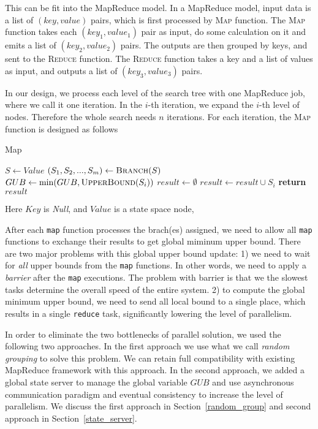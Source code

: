 This can be fit into the MapReduce model. In a MapReduce model, input data is a list of $(key, value)$ pairs, which is first processed by \textsc{Map} function. The \textsc{Map} function takes each $(key_1, value_1)$ pair as input, do some calculation on it and emits a list of $(key_2, value_2)$ pairs. The outputs are then grouped by keys, and sent to the \textsc{Reduce} function. The \textsc{Reduce} function takes a key and a list of values as input, and outputs a list of $(key_3, value_3)$ pairs.

In our design, we process each level of the search tree with one MapReduce job, where we call it one iteration. In the $i$-th iteration, we expand the $i$-th level of nodes. Therefore the whole search needs $n$ iterations. For each iteration, the \textsc{Map} function is designed as follows
\begin{algorithm}
\caption{Map}
\begin{algorithmic}[1]
    \State $S \gets Value$
    \State $(S_1,S_2,...,S_m) \gets \textsc{Branch}(S)$
        \State $GUB \gets \min(GUB, \textsc{UpperBound}(S_i))$
    \EndFor
    \State $result \gets \emptyset$
            \State $result \gets result\cup S_i$
        \EndIf
    \EndFor
    \State \textbf{return }$result$
\EndFunction
\end{algorithmic}
\end{algorithm}

Here $Key$ is \textit{Null}, and $Value$ is a state space node, 


After each \texttt{map} function processes the brach(es) assigned, we need to allow all \texttt{map} functions to exchange their results to get global miminum upper bound. There are two major problems with this global upper bound update: 1) we need to wait for \emph{all} upper bounds from the \texttt{map} functions. In other words, we need to apply a \emph{barrier} after the \texttt{map} executions. The problem with barrier is that we the slowest tasks determine the overall speed of the entire system. 2) to compute the global minimum upper bound, we need to send all local bound to a single place, which results in a single \texttt{reduce} task, significantly lowering the level of parallelism.

In order to eliminate the two bottlenecks of parallel solution, we used the following two approaches. In the first approach we use what we call \textit{random grouping} to solve this problem. We can retain full compatibility with existing MapReduce framework with this approach. In the second approach, we added a global state server to manage the global variable $GUB$ and use asynchronous communication paradigm and eventual consistency to increase the level of parallelism.  We discuss the first approach in Section~\ref{random_group} and second approach in Section~\ref{state_server}.


